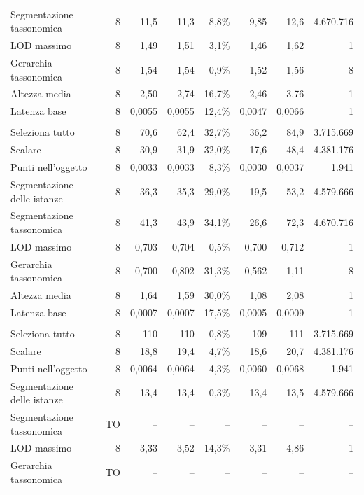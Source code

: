 \begin{small}
\begin{longtable}{lrrrrrr r}
\quad Segmentazione tassonomica & 8 & 11,5 & 11,3 & 8,8\% & 9,85 & 12,6 & 4.670.716 \\
\quad LOD massimo & 8 & 1,49 & 1,51 & 3,1\% & 1,46 & 1,62 & 1 \\
\quad Gerarchia tassonomica & 8 & 1,54 & 1,54 & 0,9\% & 1,52 & 1,56 & 8 \\
\quad Altezza media & 8 & 2,50 & 2,74 & 16,7\% & 2,46 & 3,76 & 1 \\
\quad Latenza base & 8 & 0,0055 & 0,0055 & 12,4\% & 0,0047 & 0,0066 & 1 \\
\addlinespace
\multicolumn{8}{l}{\textbf{Owlready2}}\\
\quad Seleziona tutto & 8 & 70,6 & 62,4 & 32,7\% & 36,2 & 84,9 & 3.715.669 \\
\quad Scalare & 8 & 30,9 & 31,9 & 32,0\% & 17,6 & 48,4 & 4.381.176 \\
\quad Punti nell'oggetto & 8 & 0,0033 & 0,0033 & 8,3\% & 0,0030 & 0,0037 & 1.941 \\
\quad Segmentazione delle istanze & 8 & 36,3 & 35,3 & 29,0\% & 19,5 & 53,2 & 4.579.666 \\
\quad Segmentazione tassonomica & 8 & 41,3 & 43,9 & 34,1\% & 26,6 & 72,3 & 4.670.716 \\
\quad LOD massimo & 8 & 0,703 & 0,704 & 0,5\% & 0,700 & 0,712 & 1 \\
\quad Gerarchia tassonomica & 8 & 0,700 & 0,802 & 31,3\% & 0,562 & 1,11 & 8 \\
\quad Altezza media & 8 & 1,64 & 1,59 & 30,0\% & 1,08 & 2,08 & 1 \\
\quad Latenza base & 8 & 0,0007 & 0,0007 & 17,5\% & 0,0005 & 0,0009 & 1 \\
\addlinespace
\multicolumn{8}{l}{\textbf{Oxigraph}}\\
\quad Seleziona tutto & 8 & 110 & 110 & 0,8\% & 109 & 111 & 3.715.669 \\
\quad Scalare & 8 & 18,8 & 19,4 & 4,7\% & 18,6 & 20,7 & 4.381.176 \\
\quad Punti nell'oggetto & 8 & 0,0064 & 0,0064 & 4,3\% & 0,0060 & 0,0068 & 1.941 \\
\quad Segmentazione delle istanze & 8 & 13,4 & 13,4 & 0,3\% & 13,4 & 13,5 & 4.579.666 \\
\quad Segmentazione tassonomica & \textsf{TO} & -- & -- & -- & -- & -- & -- \\
\quad LOD massimo & 8 & 3,33 & 3,52 & 14,3\% & 3,31 & 4,86 & 1 \\
\quad Gerarchia tassonomica & \textsf{TO} & -- & -- & -- & -- & -- & -- \\

\end{longtable}
\end{small}
